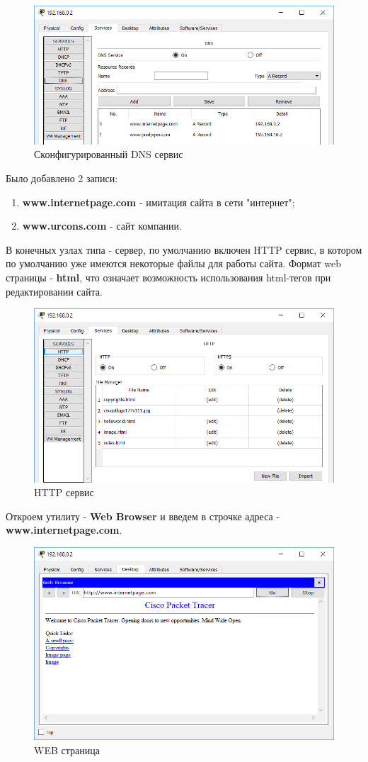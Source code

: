 \documentclass[14pt,a4paper,report]{report}
\begin{document}
\begin{figure}[h]
  \centering
  \includegraphics[width=.7\textwidth]{img/net0_0_2__2}
  \caption{Сконфигурированный DNS сервис}
\end{figure}


Было добавлено 2 записи:
\begin{enumerate}
\item \textbf{www.internetpage.com} - имитация сайта в сети "интернет";
\item \textbf{www.urcons.com} - сайт компании.
\end{enumerate}


В конечных узлах типа - сервер, по умолчанию включен HTTP сервис, в котором по умолчанию уже имеются некоторые файлы для работы сайта. Формат web страницы - \textbf{html}, что означает возможность использования html-тегов при редактировании сайта.


\begin{figure}[h]
  \centering
  \includegraphics[width=.7\textwidth]{img/net0_0_2__4}
  \caption{HTTP сервис}
\end{figure}
\clearpage

Откроем утилиту - \textbf{Web Browser} и введем в строчке адреса - \textbf{www.internetpage.com}. 

\begin{figure}[h]
  \centering
  \includegraphics[width=.7\textwidth]{img/net0_0_2__5}
  \caption{WEB страница}
\end{figure}
\end{document}
